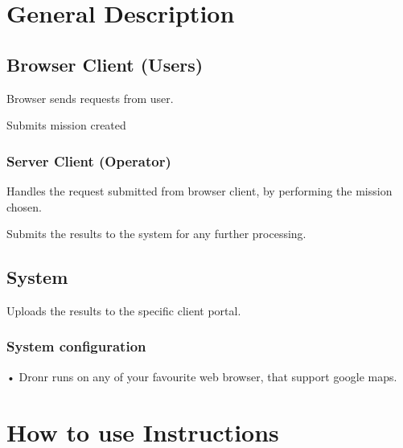 \documentclass{article}
\begin{document}
					
	\section{General Description}
		\subsection{Browser Client (Users)}
			
			\begin{itemson}
				\item Browser sends requests from user.
				\item Submits mission created 
			\end{itemson}
				
				
			\subsubsection{Server Client (Operator)}
			
			\begin{itemson}
				\item 	Handles the request submitted from browser client, by performing the mission chosen.
				
				\item	Submits the results to the system for any further processing.
			\end{itemson}
			
			\subsection{System}
    	    \begin{itemson}
				\item Uploads the results to the specific client portal.
			\end{itemson}
				
				
			\subsubsection{System configuration}
			 \begin{item}
			 	\item •	Dronr runs on any of your favourite web browser, that support google maps. 
			 \end{item}	
				
	\section{How to use Instructions}%
			
\end{document}
